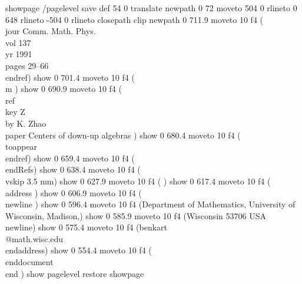 showpage
/pagelevel save def
54 0 translate
newpath 0 72 moveto 504 0 rlineto 0 648 rlineto -504 0 rlineto  closepath clip newpath
0 711.9 moveto
10 f4
(\\jour Comm. Math. Phys. \\vol 137 \\yr 1991  \\pages  29--66 \\endref) show
0 701.4 moveto
10 f4
(\\m ) show
0 690.9 moveto
10 f4
(\\ref \\key Z \\by K. Zhao \\paper Centers of down-up algebras  ) show
0 680.4 moveto
10 f4
(\\toappear \\endref) show
0 659.4 moveto
10 f4
(\\endRefs) show
0 638.4 moveto
10 f4
(\\vskip 3.5 mm) show
0 627.9 moveto
10 f4
( ) show
0 617.4 moveto
10 f4
(\\address ) show
0 606.9 moveto
10 f4
(\\newline ) show
0 596.4 moveto
10 f4
(Department of Mathematics, University of Wisconsin, Madison,) show
0 585.9 moveto
10 f4
(Wisconsin 53706 USA  \\newline) show
0 575.4 moveto
10 f4
(benkart\\@math.wisc.edu \\endaddress) show
0 554.4 moveto
10 f4
(\\enddocument \\end  ) show
pagelevel restore
showpage
